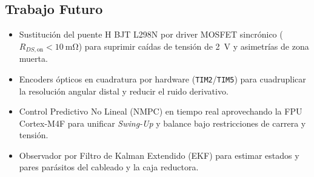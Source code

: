\subsection{Trabajo Futuro}
\begin{itemize}
    \item Sustitución del puente H BJT L298N por driver MOSFET sincrónico ($R_{DS,\text{on}}<\qty{10}{\milli\ohm}$) para suprimir caídas de tensión de \qty{2}{\volt} y asimetrías de zona muerta.
    \item Encoders ópticos en cuadratura por hardware (\texttt{TIM2}/\texttt{TIM5}) para cuadruplicar la resolución angular distal y reducir el ruido derivativo.
    \item Control Predictivo No Lineal (NMPC) en tiempo real aprovechando la FPU Cortex-M4F para unificar \textit{Swing-Up} y balance bajo restricciones de carrera y tensión.
    \item Observador por Filtro de Kalman Extendido (EKF) para estimar estados y pares parásitos del cableado y la caja reductora.
\end{itemize}
